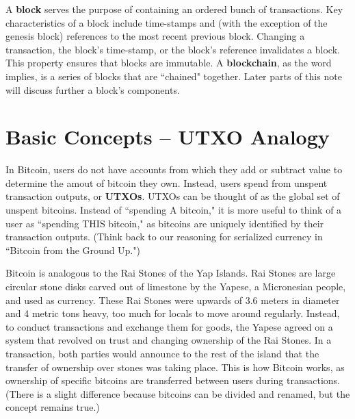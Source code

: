 \documentclass[11pt]{article}
\begin{document}
    A \textbf{block} serves the purpose of containing an ordered bunch of transactions. Key characteristics of a block include time-stamps and (with the exception of the genesis block) references to the most recent previous block. Changing a transaction, the block's time-stamp, or the block's reference invalidates a block. This property ensures that blocks are immutable. A \textbf{blockchain}, as the word implies, is a series of blocks that are ``chained" together. Later parts of this note will discuss further a block's components.
       
   \section*{Basic Concepts -- UTXO Analogy}
   
    In Bitcoin, users do not have accounts from which they add or subtract value to determine the amout of bitcoin they own. Instead, users spend from unspent transaction outputs, or \textbf{UTXOs}. UTXOs can be thought of as the global set of unspent bitcoins. Instead of ``spending A bitcoin," it is more useful to think of a user as ``spending THIS bitcoin," as bitcoins are uniquely identified by their transaction outputs. (Think back to our reasoning for serialized currency in ``Bitcoin from the Ground Up.")
    
    Bitcoin is analogous to the Rai Stones of the Yap Islands. Rai Stones are large circular stone disks carved out of limestone by the Yapese, a Micronesian people, and used as currency. These Rai Stones were upwards of 3.6 meters in diameter and 4 metric tons heavy, too much for locals to move around regularly. Instead, to conduct transactions and exchange them for goods, the Yapese agreed on a system that revolved on trust and changing ownership of the Rai Stones. In a transaction, both parties would announce to the rest of the island that the transfer of ownership over stones was taking place. This is how Bitcoin works, as ownership of specific bitcoins are transferred between users during transactions. (There is a slight difference because bitcoins can be divided and renamed, but the concept remains true.)
    
\end{document}
